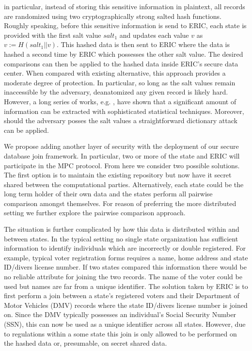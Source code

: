in particular, instead of storing this sensitive information in plaintext, all records are randomized using two cryptographically strong salted hash functions. Roughly speaking, before this sensitive information is send to ERIC, each state is provided with the first salt value $salt_1$ and updates each value $v$ as $v := H(salt_1 || v)$. This hashed data is then sent to ERIC where the data is hashed a second time by ERIC which possesses the other salt value. The desired comparisons can then be applied to the hashed data inside ERIC's secure data center. When compared with existing alternative, this approach provides a moderate degree of protection. In particular, so long as the salt values remain inaccessible by the adversary, deanatomized any given record is likely hard. However, a long series of works, e.g. \cite{deanon0,deanon1,deanon2,deanon3,deanon4}, have shown that a significant amount of information can be extracted with sophisticated statistical techniques. Moreover, should the adversary posses the salt values a straightforward dictionary attack can be applied.

We propose adding another layer of security with the deployment of our secure database join framework. In particular, two or more of the state and ERIC will participate in the MPC protocol. From here we consider two possible solutions. The first option is to maintain the existing repository but now have it secret shared between the computational parties. Alternatively, each state could be the long term holder of their own data and the states perform all pairwise comparison amongst themselves. For reason of preferring the more distributed setting we further explore the pairwise comparison approach. 

The situation is further complicated by how this data is distributed within and between states. In the typical setting no single state organization has sufficient information to identify individuals which are incorrectly or double registered. For example, typical voter registration forms requires a name, home address and state ID/divers license number. If two states compared this information there would be no reliable attribute for joining the two records. The name of the voter could be used but names are far from a unique identifier. The solution taken by ERIC is to first perform a join between a state's registered voters and their Department of Motor Vehicles (DMV) records where the state ID/divers license number is joined on. Since the DMV typically possesses an individual's Social Security Number (SSN), this can now be used as a unique identifier across all states. However, due to regulations within a some state this join is only allowed to be performed on the hashed data or, presumable, on secret shared data.

